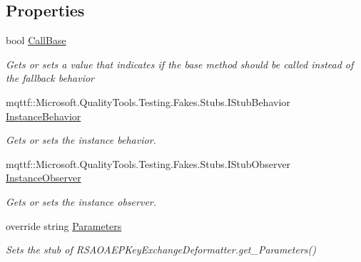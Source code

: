 \subsection*{Properties}
\begin{DoxyCompactItemize}
\item 
bool \hyperlink{class_system_1_1_security_1_1_cryptography_1_1_fakes_1_1_stub_r_s_a_o_a_e_p_key_exchange_deformatter_a5144c8a13e6e432aab1be2c6d453b8be}{Call\-Base}
\begin{DoxyCompactList}\small\item\em Gets or sets a value that indicates if the base method should be called instead of the fallback behavior\end{DoxyCompactList}\item 
mqttf\-::\-Microsoft.\-Quality\-Tools.\-Testing.\-Fakes.\-Stubs.\-I\-Stub\-Behavior \hyperlink{class_system_1_1_security_1_1_cryptography_1_1_fakes_1_1_stub_r_s_a_o_a_e_p_key_exchange_deformatter_adf1de6369d53b415205de2c1fb9ab693}{Instance\-Behavior}
\begin{DoxyCompactList}\small\item\em Gets or sets the instance behavior.\end{DoxyCompactList}\item 
mqttf\-::\-Microsoft.\-Quality\-Tools.\-Testing.\-Fakes.\-Stubs.\-I\-Stub\-Observer \hyperlink{class_system_1_1_security_1_1_cryptography_1_1_fakes_1_1_stub_r_s_a_o_a_e_p_key_exchange_deformatter_aac31a4a96076b86231e06e47faf36103}{Instance\-Observer}
\begin{DoxyCompactList}\small\item\em Gets or sets the instance observer.\end{DoxyCompactList}\item 
override string \hyperlink{class_system_1_1_security_1_1_cryptography_1_1_fakes_1_1_stub_r_s_a_o_a_e_p_key_exchange_deformatter_ab891b1e359e4b89ffdd2a42c02ce82d4}{Parameters}
\begin{DoxyCompactList}\small\item\em Sets the stub of R\-S\-A\-O\-A\-E\-P\-Key\-Exchange\-Deformatter.\-get\-\_\-\-Parameters()\end{DoxyCompactList}\end{DoxyCompactItemize}


